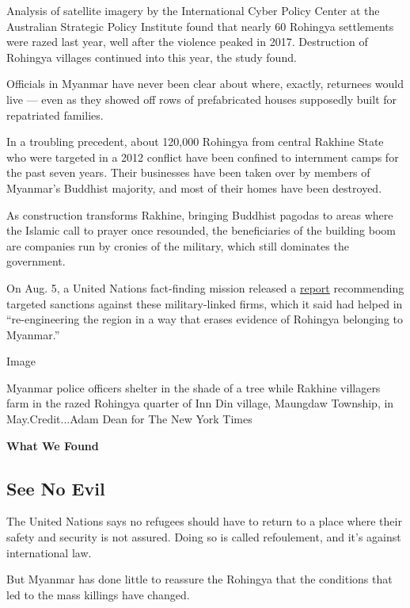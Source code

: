 Analysis of satellite imagery by the International Cyber Policy Center
at the Australian Strategic Policy Institute found that nearly 60
Rohingya settlements were razed last year, well after the violence
peaked in 2017. Destruction of Rohingya villages continued into this
year, the study found.

Officials in Myanmar have never been clear about where, exactly,
returnees would live --- even as they showed off rows of prefabricated
houses supposedly built for repatriated families.

In a troubling precedent, about 120,000 Rohingya from central Rakhine
State who were targeted in a 2012 conflict have been confined to
internment camps for the past seven years. Their businesses have been
taken over by members of Myanmar's Buddhist majority, and most of their
homes have been destroyed.

As construction transforms Rakhine, bringing Buddhist pagodas to areas
where the Islamic call to prayer once resounded, the beneficiaries of
the building boom are companies run by cronies of the military, which
still dominates the government.

On Aug. 5, a United Nations fact-finding mission released a
\href{https://www.ohchr.org/Documents/HRBodies/HRCouncil/FFM-Myanmar/EconomicInterestsMyanmarMilitary/A_HRC_42_CRP_3.pdf}{report}
recommending targeted sanctions against these military-linked firms,
which it said had helped in ``re-engineering the region in a way that
erases evidence of Rohingya belonging to Myanmar.''

Image

Myanmar police officers shelter in the shade of a tree while Rakhine
villagers farm in the razed Rohingya quarter of Inn Din village,
Maungdaw Township, in May.Credit...Adam Dean for The New York Times

\textbf{What We Found}

\hypertarget{see-no-evil}{%
\subsection{See No Evil}\label{see-no-evil}}

The United Nations says no refugees should have to return to a place
where their safety and security is not assured. Doing so is called
refoulement, and it's against international law.

But Myanmar has done little to reassure the Rohingya that the conditions
that led to the mass killings have changed.

